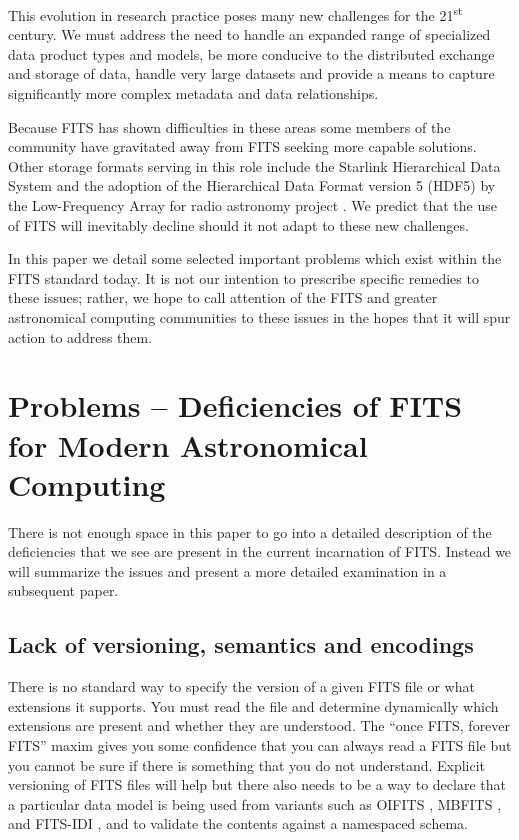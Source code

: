 \documentclass[11pt,twoside]{article}
\begin{document}
This evolution in research practice poses many new challenges for the
21\textsuperscript{st} century. 
We must address the need to handle an expanded
range of specialized data product types and models, be more conducive to the
distributed exchange and storage of data, handle very large datasets and
provide a means to capture significantly more complex metadata and data
relationships.

Because FITS has shown difficulties in these areas some members of the community 
have gravitated away from FITS seeking more capable solutions.
Other storage formats serving in this role include the Starlink Hierarchical Data System
\citep[HDS;][]{1982QJRAS..23..485D,P91_adassxxiii} and the adoption of the Hierarchical 
Data Format version 5 (HDF5) by the Low-Frequency Array for radio astronomy 
project \citep[LOFAR;][]{2011ASPC..442...53A}.
We predict that the use of FITS will inevitably decline should it not adapt 
to these new challenges.

In this paper we detail some selected important problems which exist 
within the FITS standard today.  It is not our intention to prescribe 
specific remedies to these issues; rather, we hope to call attention 
of the FITS and greater astronomical computing communities to these 
issues in the hopes that it will spur action to address them.

\section{Problems -- Deficiencies of FITS for Modern Astronomical Computing}

There is not enough space in this paper to go into a detailed
description of the deficiencies that we see are present in the current
incarnation of FITS. Instead we will summarize the issues and present
a more detailed examination in a subsequent paper.

\subsection{Lack of versioning, semantics and encodings}

There is no standard way to specify the version of a given FITS file or
what extensions it supports. You must read the file and determine
dynamically which extensions are present and whether they are
understood. The ``once FITS, forever FITS'' maxim gives you some
confidence that you can always read a FITS file but you cannot be sure
if there is something that you do not understand.  Explicit versioning
of FITS files will help but there also needs to be a way to declare that
a particular data model is being used from variants such as OIFITS
\citep{2006SPIE.6268E.106T}, MBFITS \citep{2006A&A...454L..25M}, and
FITS-IDI \citep{2011AIPS114}, and to validate the contents against a
namespaced schema.
\end{document}
